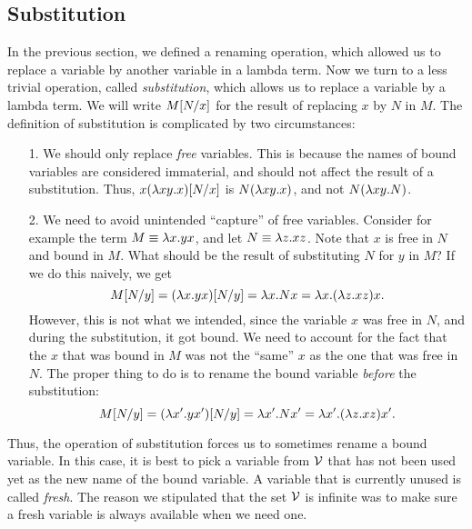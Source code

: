 \documentclass{article}
\begin{document}
\subsection{Substitution}\label{ssec-substitution}

In the previous section, we defined a renaming operation, which
allowed us to replace a variable by another variable in a lambda term.
Now we turn to a less trivial operation, called {\em substitution},
which allows us to replace a variable by a lambda term. We will write
$M[N/x]$ for the result of replacing $x$ by $N$ in $M$. The
definition of substitution is complicated by two circumstances:
\begin{enumerate}
\item[1.] We should only replace {\em free} variables. This is because
  the names of bound variables are considered immaterial, and should
  not affect the result of a substitution. Thus, $x(\lambda
    xy.x)[N/x]$ is $N(\lambda xy.x)$, and not $N(\lambda xy.N)$.
\item[2.] We need to avoid unintended ``capture'' of free
  variables. Consider for example the term $M\equiv\lambda x.yx$, and let
  $N\equiv\lambda z.xz$. Note that $x$ is free in $N$ and bound in $M$.
  What should be the result of substituting $N$ for $y$ in $M$?
  If we do this naively, we get 
  \[ M[N/y]=(\lambda x.yx)[N/y]=
     \lambda x.Nx=\lambda x.(\lambda z.xz)x. 
  \]
  However, this is not what we intended, since the variable $x$ was
  free in $N$, and during the substitution, it got bound. We need to
  account for the fact that the $x$ that was bound in $M$ was not the
  ``same'' $x$ as the one that was free in $N$. The proper thing to do
  is to rename the bound variable {\em before} the substitution:
  \[ M[N/y]=(\lambda x'.yx')[N/y]=
     \lambda x'.Nx'=\lambda x'.(\lambda z.xz)x'. 
  \]
\end{enumerate}

Thus, the operation of substitution forces us to sometimes rename a
bound variable. In this case, it is best to pick a variable from
${\cal V}$ that has not been used yet as the new name of the bound
variable. A variable that is currently unused is called {\em fresh}.
The reason we stipulated that the set ${\cal V}$ is infinite was to make
sure a fresh variable is always available when we need one.
\end{document}
